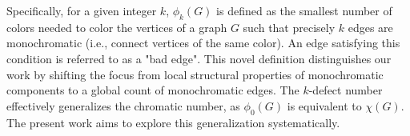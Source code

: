 \documentclass[12pt]{amsart}
\theoremstyle{definition}
\theoremstyle{remark}
\numberwithin{equation}{section}
\begin{document}







Specifically, for a given integer \(k\), \(\phi _{k}(G)\) is defined as the smallest number of colors needed to color the vertices of a graph \(G\) such that precisely \(k\) edges are monochromatic (i.e., connect vertices of the same color). An edge satisfying this condition is referred to as a "bad edge". This novel definition distinguishes our work by shifting the focus from local structural properties of monochromatic components to a global count of monochromatic edges. The $k$-defect number effectively generalizes the chromatic number, as \(\phi _{0}(G)\) is equivalent to \(\chi (G)\). The present work aims to explore this generalization systematically. \\
\end{document}
